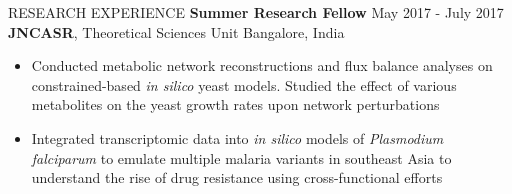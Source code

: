 \documentclass{resume} %
\begin{document}
\begin{rSection}{RESEARCH EXPERIENCE}
   \textbf{Summer Research Fellow} \hfill May 2017 - July 2017\\
   \textbf{JNCASR}, Theoretical Sciences Unit \hfill {Bangalore, India}
   \begin{itemize}
      \itemsep -1pt {}
      \item Conducted metabolic network reconstructions and flux balance analyses on constrained-based \textit{in silico} yeast models. Studied the effect of various metabolites on the yeast growth rates upon network perturbations
      \item Integrated transcriptomic data into \textit{in silico} models of \textit{Plasmodium falciparum} to emulate multiple malaria variants in southeast Asia to understand the rise of drug resistance using cross-functional efforts
   \end{itemize}

\end{rSection}

\end{document}

